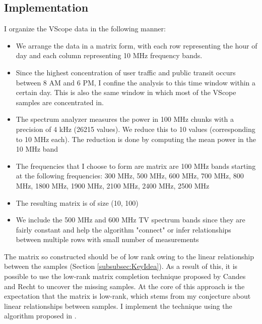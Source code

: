 \subsection{Implementation}

I organize the VScope data in the following manner:

\begin{itemize}
\item We arrange the data in a matrix form, with each row representing the hour of day and each column representing 10 MHz frequency bands.
\item Since the highest concentration of user traffic and public transit occurs between 8 AM and 6 PM, I confine the analysis to this time window within a certain day. This is also the same window in which most of the VScope samples are concentrated in.
\item The spectrum analyzer measures the power in 100 MHz chunks with a precision of 4 kHz (26215 values). We reduce this to 10 values (corresponding to 10 MHz each). The reduction is done by computing the mean power in the 10 MHz band
\item The frequencies that I choose to form are matrix are 100 MHz bands starting at the following frequencies: 300 MHz, 500 MHz, 600 MHz, 700 MHz, 800 MHz, 1800 MHz, 1900 MHz, 2100 MHz, 2400 MHz, 2500 MHz
\item The resulting matrix is of size (10, 100)
\item We include the 500 MHz and 600 MHz TV spectrum bands since they are fairly constant and help the algorithm "connect" or infer relationships between multiple rows with small number of measurements
\end{itemize}

The matrix so constructed should be of low rank owing to the linear relationship between the samples (Section \ref{subsubsec:KeyIdea}).
 As a result of this, it is possible to use the low-rank matrix completion technique proposed by Candes and Recht \cite{CandesRecht} to uncover the missing samples.
 At the core of this approach is the expectation that the matrix is low-rank, which stems from my conjecture about linear relationships between samples.
 I implement the technique using the algorithm proposed in \cite{SVThresholding}.


